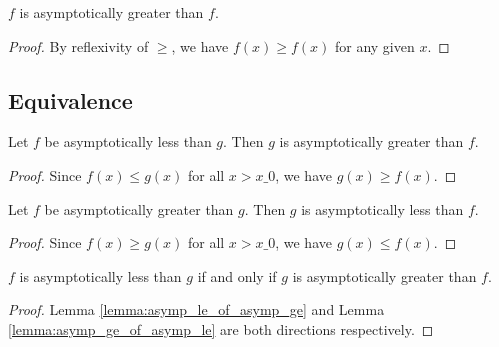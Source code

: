 \begin{lemma}
    \label{lemma:asymp_ge_refl}
    \leanok
    $f$ is asymptotically greater than $f$.
\end{lemma}

\begin{proof}
    \leanok
    By reflexivity of $\ge$, we have $f(x) \ge f(x)$ for any given $x$.
\end{proof}


\subsection{Equivalence}

\begin{lemma}
    \label{lemma:asymp_le_of_asymp_ge}
    \leanok
    Let $f$ be asymptotically less than $g$. Then $g$ is asymptotically
    greater than $f$.
\end{lemma}

\begin{proof}
    \leanok
    Since $f(x) \le g(x)$ for all $x > x\_0$, we have $g(x) \ge f(x)$.
\end{proof}

\begin{lemma}
    \label{lemma:asymp_ge_of_asymp_le}
    \leanok
    Let $f$ be asymptotically greater than $g$. Then $g$ is asymptotically
    less than $f$.
\end{lemma}

\begin{proof}
    \leanok
    Since $f(x) \ge g(x)$ for all $x > x\_0$, we have $g(x) \le f(x)$.
\end{proof}

\begin{theorem}
    \label{thm:asymp_le_iff_asymp_ge}
    \leanok
    $f$ is asymptotically less than $g$ if and only if $g$ is asymptotically
    greater than $f$.
\end{theorem}

\begin{proof}
    \leanok
    Lemma \ref{lemma:asymp_le_of_asymp_ge} and Lemma \ref{lemma:asymp_ge_of_asymp_le} are both directions
    respectively.
\end{proof}


